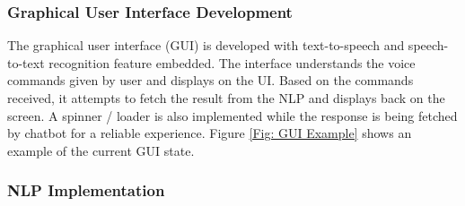\subsubsection{Graphical User Interface Development}
The graphical user interface (GUI) is developed with text-to-speech and speech-to-text recognition feature embedded. The interface understands the voice commands given by user and displays on the UI. Based on the commands received, it attempts to fetch the result from the NLP and displays back on the screen. A spinner / loader is also implemented while the response is being fetched by chatbot for a reliable experience. Figure \ref{Fig: GUI Example} shows an example of the current GUI state.

\subsubsection{NLP Implementation}

